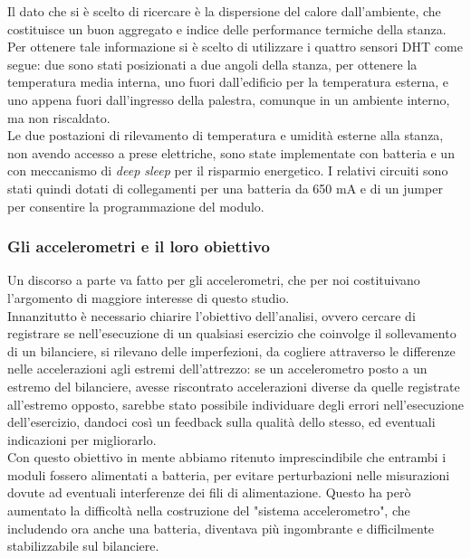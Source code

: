 \documentclass[fleqn,10pt]{SelfArx} %
\begin{document}
Il dato che si è scelto di ricercare è la dispersione del calore dall'ambiente, che costituisce un buon aggregato e 
indice delle performance termiche della stanza.\\
Per ottenere tale informazione si è scelto di utilizzare i quattro sensori DHT come segue: due sono stati 
posizionati a due angoli della stanza, per ottenere la temperatura media interna, uno fuori dall'edificio per la 
temperatura esterna, e uno appena fuori dall'ingresso della palestra, comunque in un ambiente interno, ma non riscaldato.
\\
Le due postazioni di rilevamento di temperatura e umidità esterne alla stanza, non avendo accesso a prese elettriche, 
sono state implementate con batteria e un con meccanismo di \textit{deep sleep} per il risparmio energetico. 
I relativi circuiti sono stati quindi dotati di collegamenti per una batteria da 650 mA e di un jumper per consentire la 
programmazione del modulo.

\subsubsection{Gli accelerometri e il loro obiettivo}

Un discorso a parte va fatto per gli accelerometri, che per noi costituivano l'argomento di maggiore interesse 
di questo studio.\\
Innanzitutto è necessario chiarire l'obiettivo dell'analisi, ovvero cercare di registrare 
se nell'esecuzione di un qualsiasi esercizio che coinvolge il sollevamento di un bilanciere, si rilevano delle 
imperfezioni, da cogliere attraverso le differenze nelle accelerazioni agli estremi dell'attrezzo: se un accelerometro 
posto a un estremo del bilanciere, avesse riscontrato accelerazioni diverse da quelle registrate 
all'estremo opposto, sarebbe stato possibile individuare degli errori nell'esecuzione dell'esercizio, 
dandoci così un feedback sulla qualità dello stesso, ed eventuali indicazioni per migliorarlo.\\

Con questo obiettivo in mente abbiamo ritenuto imprescindibile che entrambi i moduli fossero alimentati a batteria, 
per evitare perturbazioni nelle misurazioni dovute ad eventuali interferenze dei fili di alimentazione. Questo ha però 
aumentato la difficoltà nella costruzione del "sistema accelerometro", che includendo ora anche una batteria, 
diventava più ingombrante e difficilmente stabilizzabile sul bilanciere.\\
\end{document}
